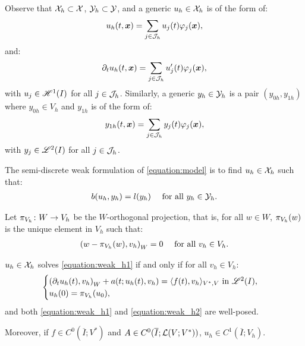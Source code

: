 Observe that $\mathcal{X}_h \subset \mathcal{X}$, $\mathcal{Y}_h \subset \mathcal{Y}$, and a generic $u_h \in \mathcal{X}_h$ is of the form of:
\begin{align}
    u_h(t, \bm{x}) = \sum_{j \in \mathcal{J}_h} u_j(t) \varphi_j(\bm{x}),
\end{align}
and:
\begin{align}
    \partial_t u_h(t, \bm{x}) = \sum_{j \in \mathcal{J}_h} u_j^{\prime}(t) \varphi_j(\bm{x}),
\end{align}
with $u_j \in \mathscr{H}^{1}(I)$ for all $j \in \mathcal{J}_h$. Similarly, a generic $y_h \in \mathcal{Y}_h$ is a pair $(y_{0h}, y_{1h})$ where $y_{0h} \in V_h$ and $y_{1h}$ is of the form of:
\begin{align}
    y_{1h}(t, \bm{x}) = \sum_{j \in \mathcal{J}_h} y_j(t) \varphi_j(\bm{x}),
\end{align}
with $y_j \in \mathscr{L}^{2}(I)$ for all $j \in \mathcal{J}_h$.

\begin{definition}
    The semi-discrete weak formulation of \cref{equation:model} is to find $u_h \in \mathcal{X}_h$ such that:
    \begin{align} \label{equation:weak_h1}
        b(u_h, y_h) &= l(y_h) &\text{ for all } y_h \in \mathcal{Y}_h.
    \end{align}
\end{definition}

\begin{definition}[$\ProjectionOnto{V_h}$]
    Let $\pi_{V_h} \colon W \rightarrow V_h$ be the $W$-orthogonal projection, that is, for all $w \in W$, $\pi_{V_h}(w)$ is the unique element in $V_h$ such that:
    \begin{align}
        \left( w - \pi_{V_h}(w), v_h \right)_W &= 0 &\text{ for all } v_h \in V_h.
    \end{align}
\end{definition}

\begin{proposition}[Equivalence]
    $u_h \in \mathcal{X}_h$ solves \cref{equation:weak_h1} if and only if for all $v_h \in V_h$:
    \begin{align}
        \begin{cases} \label{equation:weak_h2}
            \left( \partial_t u_h(t), v_h \right)_W + a(t; u_h(t), v_h) = \langle f(t), v_h \rangle_{V^*, V} \text{ in } \mathscr{L}^{2}(I), \\
            u_h(0) = \pi_{V_h}(u_0),
        \end{cases}
    \end{align}
    and both \cref{equation:weak_h1} and \cref{equation:weak_h2} are well-posed.

    Moreover, if $f \in C^0(\overline{I}; V^*)$ and $A \in C^0(\overline{I}; \mathcal{L}(V; V^*))$, $u_h \in C^1(\overline{I}; V_h)$.
\end{proposition}

